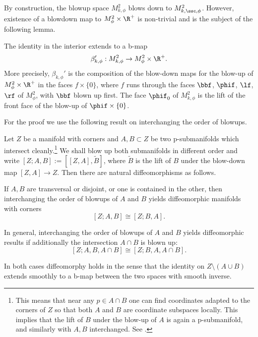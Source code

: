 By construction, the blowup space $M^{2}_{k, \phi}$
blows down to
$M^{2}_{k, \ssc,\phi}$. However, existence of a blowdown map to
$M^{2}_{\phi} \times \R^+$ is non-trivial and is the subject of the
following lemma.

\begin{Lemma} \label{lemma b-map cons}
The identity in the interior extends to a b-map
\[
\beta_{k,\phi}' : M^{2}_{k,\phi} \to M^{2}_{\phi}\times \R^+.
\]
More precisely, $\beta_{k,\phi}'$ is the composition of the blow-down maps for the blow-up of $M^2_\phi\times \R^+$ in the faces $f\times\{0\}$, where $f$ runs through the faces $\bbf$, $\phif$, $\lf$, $\rf$ of $M^2_\phi$, with $\bbf$ blown up first.
The face $\phif_0$ of $M^2_{k,\phi}$ is the lift of the front face of the blow-up of $\phif\times\{0\}$.
\end{Lemma}

For the proof we use the following result on interchanging the
order of blowups.

\begin{Lemma} \label{lem:commuting blow-ups}
Let $Z$ be a manifold with corners and $A,B\subset Z$ be two
p-submanifolds which intersect cleanly.\footnote{This means that near any $p\in A\cap B$ one can find coordinates adapted to the corners
of $Z$ so that both $A$ and $B$ are coordinate subspaces locally. This implies that the lift of $B$ under the blow-up of $A$ is again a p-submanifold, and similarly with $A,B$ interchanged. See \cite[Prop.\,5.7.2]{Mel-diff}.} We shall blow up both submanifolds in different order and
write \eg $[Z;A,B] := [[Z,A],\widetilde{B}]$, where $\widetilde{B}$ is the lift of
$B$ under the blow-down map $[Z,A]\to Z$. Then there are natural diffeomorphisms as follows.

\begin{enumeratea}
\item\label{lem:commuting blow-upsa}
If $A,B$ are transversal or disjoint, or one is contained in the other, then
interchanging the order of blowups of $A$ and $B$ yields diffeomorphic manifolds with corners
\[
[Z;A,B]\cong[Z;B,A].
\]

\item\label{lem:commuting blow-upsb}
In general, interchanging the order of blowups of
$A$ and $B$ yields diffeomorphic results if additionally the intersection $A\cap B$ is blown up:
\[
[Z; A,B,A\cap B] \cong [Z; B, A, A\cap B].
\]
\end{enumeratea}
In both cases diffeomorphy holds in the sense that the identity on $Z\setminus(A\cup B)$ extends smoothly to a b-map
between the two spaces with smooth inverse.
\end{Lemma}

